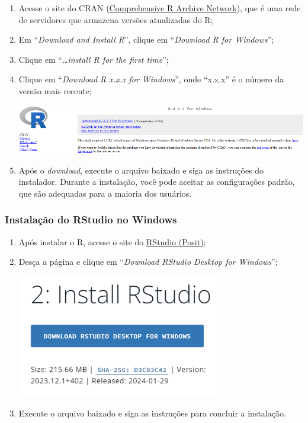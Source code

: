 \documentclass[
]{book}
\begin{document}
\begin{enumerate}
\def\labelenumi{\arabic{enumi}.}
\item
  Acesse o site do CRAN (\href{https://cran.r-project.org}{Comprehensive R Archive Network}), que é uma rede de servidores que armazena versões atualizadas do R;~
\item
  Em ``\emph{Download and Install R}'', clique em ``\emph{Download R for Windows}'';~
\item
  Clique em ``\emph{\ldots install R for the first time}'';
\item
  Clique em ``\emph{Download R x.x.x for Windows}'', onde ``x.x.x'' é o número da versão mais recente;

  \includegraphics{images/clipboard-1429771558.png}
\item
  Após o \emph{download}, execute o arquivo baixado e siga as instruções do instalador. Durante a instalação, você pode aceitar as configurações padrão, que são adequadas para a maioria dos usuários.
\end{enumerate}

\subsubsection{Instalação do RStudio no Windows}\label{instalauxe7uxe3o-do-rstudio-no-windows}

\begin{enumerate}
\def\labelenumi{\arabic{enumi}.}
\item
  Após instalar o R, acesse o site do \href{https://posit.co/download/rstudio-desktop/}{RStudio (Posit)};
\item
  Desça a página e clique em ``\emph{Download RStudio Desktop for Windows}'';

  \includegraphics[width=3.47917in,height=\textheight]{images/clipboard-3306259698.png}
\item
  Execute o arquivo baixado e siga as instruções para concluir a instalação.
\end{enumerate}
\end{document}
